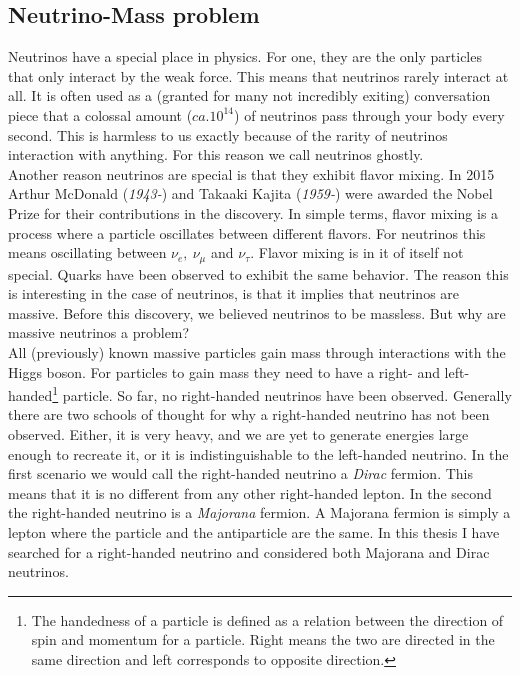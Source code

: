 \subsection{Neutrino-Mass problem}
Neutrinos have a special place in physics. For one, they are the only particles that
only interact by the weak force. This means that neutrinos rarely interact at all. It is often used
as a (granted for many not incredibly exiting) conversation piece that a colossal amount ($ca.10^{14}$) of 
neutrinos pass through your body every second. This is harmless to us exactly because of the rarity
of neutrinos interaction with anything. For this reason we call neutrinos ghostly. 
\\
Another reason neutrinos are special is that they exhibit flavor mixing. In 2015 Arthur McDonald (\emph{1943-}) and 
Takaaki Kajita (\emph{1959-}) were awarded the Nobel Prize for their contributions in the discovery. In simple terms,
flavor mixing is a process where a particle oscillates between different flavors. For neutrinos this 
means oscillating between $\nu_e,\ \nu_\mu$ and $\nu_\tau$. Flavor mixing is in it of itself not special.
Quarks have been observed to exhibit the same behavior. The reason this is interesting in the case of 
neutrinos, is that it implies that neutrinos are massive. Before this discovery, we believed neutrinos to be
massless. But why are massive neutrinos a problem?
\\
All (previously) known massive particles gain mass through interactions with the Higgs boson. For particles
to gain mass they need to have a right- and left-handed\footnote{The handedness of a particle is defined
as a relation between the direction of spin and momentum for a particle. Right means the two are directed
in the same direction and left corresponds to opposite direction.} particle. So far, no right-handed neutrinos
have been observed. Generally there are two schools of thought for why a right-handed neutrino has not been 
observed. Either, it is very heavy, and we are yet to generate energies large enough to recreate it, or 
it is indistinguishable to the left-handed neutrino. In the first scenario we would call the right-handed 
neutrino a \emph{Dirac} fermion. This means that it is no different from any other right-handed lepton. In the second
the right-handed neutrino is a \emph{Majorana} fermion. A Majorana fermion is simply a lepton where the particle
and the antiparticle are the same. In this thesis I have searched for a right-handed neutrino and considered
both Majorana and Dirac neutrinos.
